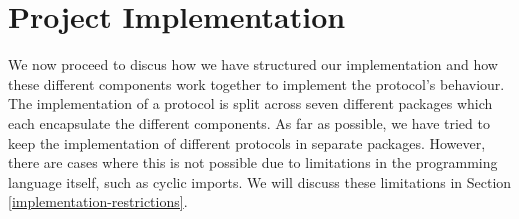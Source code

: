 \documentclass[12pt,twoside]{report}
\begin{document}
\section{Project Implementation}\label{project-structure}

We now proceed to discus how we have structured our implementation and how these different components work together to implement the protocol's behaviour. The implementation of a protocol is split across seven different packages which each encapsulate the different components. As far as possible, we have tried to keep the implementation of different protocols in separate packages. However, there are cases where this is not possible due to limitations in the programming language itself, such as cyclic imports. We will discuss these limitations in Section \ref{implementation-restrictions}.


\end{document}
